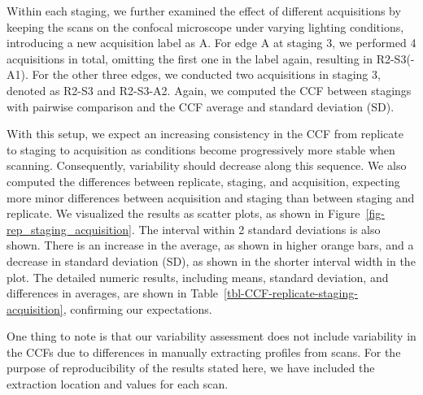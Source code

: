 \documentclass[fleqn,10pt]{wlscirep}
\begin{document}
Within each staging, we further examined the effect of different
acquisitions by keeping the scans on the confocal microscope under
varying lighting conditions, introducing a new acquisition label as A.
For edge A at staging 3, we performed 4 acquisitions in total, omitting
the first one in the label again, resulting in R2-S3(-A1). For the other
three edges, we conducted two acquisitions in staging 3, denoted as
R2-S3 and R2-S3-A2. Again, we computed the CCF between stagings with
pairwise comparison and the CCF average and standard deviation (SD).

With this setup, we expect an increasing consistency in the CCF from
replicate to staging to acquisition as conditions become progressively
more stable when scanning. Consequently, variability should decrease
along this sequence. We also computed the differences between replicate,
staging, and acquisition, expecting more minor differences between
acquisition and staging than between staging and replicate. We
visualized the results as scatter plots, as shown in
Figure~\ref{fig-rep_staging_acquisition}. The interval within 2 standard
deviations is also shown. There is an increase in the average, as shown
in higher orange bars, and a decrease in standard deviation (SD), as
shown in the shorter interval width in the plot. The detailed numeric
results, including means, standard deviation, and differences in
averages, are shown in
Table~\ref{tbl-CCF-replicate-staging-acquisition}, confirming our
expectations.

One thing to note is that our variability assessment does not include
variability in the CCFs due to differences in manually extracting
profiles from scans. For the purpose of reproducibility of the results
stated here, we have included the extraction location and values for
each scan.
\end{document}
